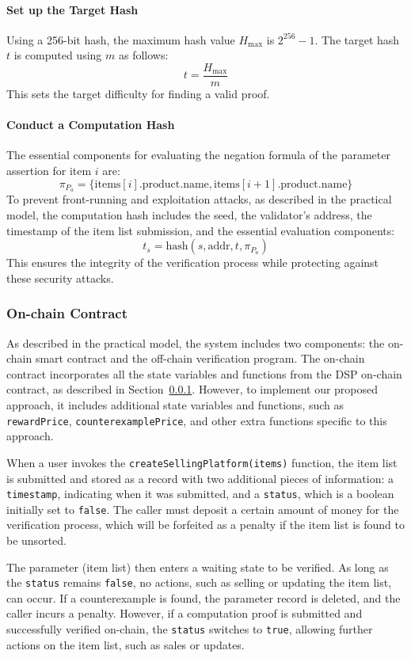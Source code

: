 \documentclass[runningheads]{llncs}
\begin{document}
\paragraph{Set up the Target Hash}
Using a 256-bit hash, the maximum hash value \( H_{\text{max}} \) is \( 2^{256} - 1 \). The target hash \( t \) is computed using \( m \) as follows:
\[
t = \frac{H_{\text{max}}}{m}
\]
This sets the target difficulty for finding a valid proof.

\paragraph{Conduct a Computation Hash}
The essential components for evaluating the negation formula of the parameter assertion for item \( i \) are:
\[
\pi_{P_{a}} = \{ \text{items}[i].\text{product.name}, \text{items}[i+1].\text{product.name} \}
\]
To prevent front-running and exploitation attacks, as described in the practical model, the computation hash includes the seed, the validator's address, the timestamp of the item list submission, and the essential evaluation components:
\[
t_s = \text{hash}(s, \text{addr}, t, \pi_{P_{a}})
\]
This ensures the integrity of the verification process while protecting against these security attacks.

\subsubsection{On-chain Contract}
As described in the practical model, the system includes two components: the on-chain smart contract and the off-chain verification program. The on-chain contract incorporates all the state variables and functions from the DSP on-chain contract, as described in Section~\ref{}. However, to implement our proposed approach, it includes additional state variables and functions, such as \texttt{rewardPrice}, \texttt{counterexamplePrice}, and other extra functions specific to this approach.

When a user invokes the \texttt{createSellingPlatform(items)} function, the item list is submitted and stored as a record with two additional pieces of information: a \texttt{timestamp}, indicating when it was submitted, and a \texttt{status}, which is a boolean initially set to \texttt{false}. The caller must deposit a certain amount of money for the verification process, which will be forfeited as a penalty if the item list is found to be unsorted.

The parameter (item list) then enters a waiting state to be verified. As long as the \texttt{status} remains \texttt{false}, no actions, such as selling or updating the item list, can occur. If a counterexample is found, the parameter record is deleted, and the caller incurs a penalty. However, if a computation proof is submitted and successfully verified on-chain, the \texttt{status} switches to \texttt{true}, allowing further actions on the item list, such as sales or updates.
\end{document}
